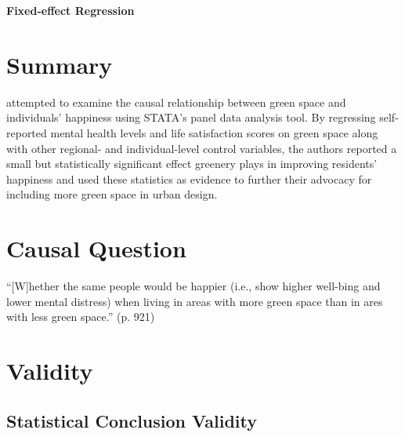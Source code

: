 \begin{center}
    \textbf{Fixed-effect Regression}
\end{center}

\begin{hangparas}{0.5in}{1}
\end{hangparas}

\section{Summary}

\textcite{white:2013} attempted to examine the causal relationship between green space and individuals' happiness using STATA's panel data analysis tool. By regressing self-reported mental health levels and life satisfaction scores on green space along with other regional- and individual-level control variables, the authors reported a small but statistically significant effect greenery plays in improving residents' happiness and used these statistics as evidence to further their advocacy for including more green space in urban design.

\section{Causal Question}

``[W]hether the same people would be happier (i.e., show higher well-bing and lower mental distress) when living in areas with more green space than in ares with less green space.'' (p. 921)

\section{Validity}

\subsection{Statistical Conclusion Validity}

